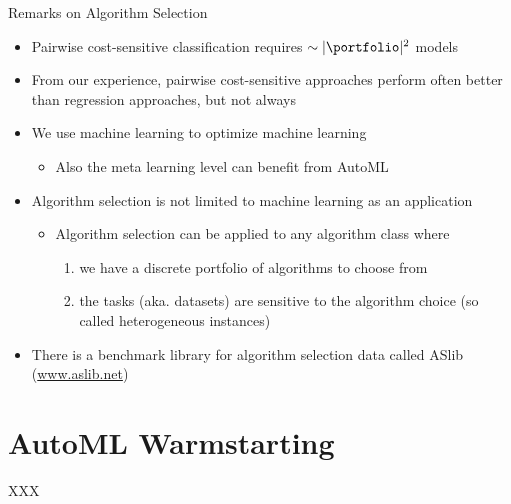 \begin{frame}[c]{Remarks on Algorithm Selection}

\begin{itemize}
	\item Pairwise cost-sensitive classification requires $\sim |\portfolio|^2$ models
	\pause
	\item From our experience, pairwise cost-sensitive approaches perform often better than regression approaches, but not always
	\pause
	\item We use machine learning to optimize machine learning
	\begin{itemize}
		\item Also the meta learning level can benefit from AutoML\\ 
	\end{itemize}
	\pause
	\item Algorithm selection is not limited to machine learning as an application
	\begin{itemize}
		\item Algorithm selection can be applied to any algorithm class where 
		\begin{enumerate}
			\item we have a discrete portfolio of algorithms to choose from
			\item the tasks (aka. datasets) are sensitive to the algorithm choice (so called heterogeneous instances)
		\end{enumerate}
	\end{itemize}
	\pause
	\item There is a benchmark library for algorithm selection data called ASlib (\url{www.aslib.net}) 
\end{itemize}

\end{frame}
\section{AutoML Warmstarting}
\begin{frame}[c]{XXX}



\end{frame}
